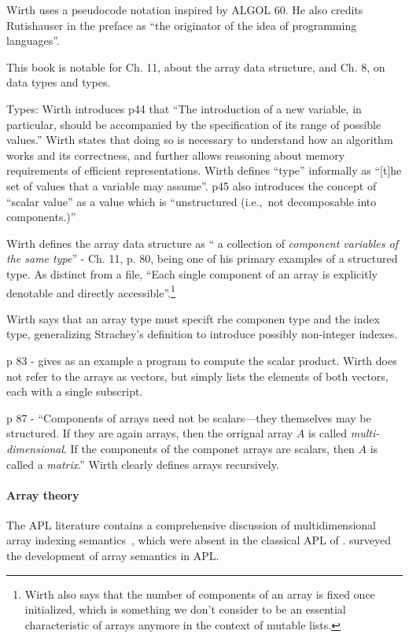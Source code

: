 Wirth uses a pseudocode notation inspired by ALGOL 60. He also credits Rutishauser
in the preface as ``the originator of the idea of programming languages''.

This book is notable for Ch. 11, about the array data structure, and Ch. 8, on data types and types.

Types: Wirth introduces p44 that ``The introduction of a new variable, in particular,
should be accompanied by the specification of
its range of possible values.'' Wirth states that doing so is necessary to understand
how an algorithm works and its correctness, and further allows reasoning about memory requirements
of efficient representations.
Wirth defines ``type'' informally as ``[t]he set of values that a variable may
assume''. p45 also introduces the concept of ``scalar value'' as a value
which is ``unstructured (i.e.,\ not decomposable into components.)''


Wirth defines the array data structure as `` a collection of \textit{component
variables of the same type}'' - Ch. 11, p. 80, being one of his primary
examples of a structured type. As distinct from a file, ``Each single component
of an array is explicitly denotable and directly accessible''.\footnote{Wirth
also says that the number of
components of an array is fixed once initialized, which is something we don't
consider to be an essential characteristic of arrays anymore in the context of
mutable lists.}

Wirth says that an array type must specift rhe componen type and the index type,
generalizing Strachey's definition to introduce possibly non-integer indexes.

p 83 - gives as an example a program to compute the scalar product.
Wirth does not refer to the arrays as vectors, but simply lists the elements of
both vectors, each with a single subscript.

p 87 - ``Components of arrays need not be scalars---they themselves may be structured.
If they are again arrays, then the orrignal array $A$ is called \textit{multi-dimensional}.
If the components of the componet arrays are scalars, then
$A$ is called a \textit{matrix}.'' Wirth clearly defines arrays recursively.


\paragraph{Array theory} The APL literature contains a comprehensive discussion
of multidimensional array indexing semantics~\cite{Brown1982}, which were
absent in the classical APL of \cite{Iverson1962}. \cite{Ruehr1982,Gerth1988}
surveyed the development of array semantics in APL.

